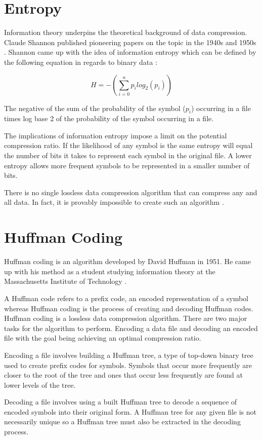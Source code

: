 \doublespacing
\singlespacing
\section{Entropy}


\singlespacing


Information theory underpins the theoretical background of data compression. Claude Shannon published pioneering papers on the topic in the 1940s and 1950s \cite{WikiDataCompression}. Shannon came up with the idea of information entropy which can be defined by the following equation in regards to binary data \cite{MasseyStudyGuide}:


\begin{equation*}
  H = -\left(\sum\limits_{i=0}^n p_{i} log_{2}(p_{i})\right)
\end{equation*}


\doublespacing
\singlespacing
The negative of the sum of the probability of the symbol ($p_{i}$) occurring in a file times log base 2 of the probability of the symbol occurring in a file.


\doublespacing
\singlespacing
The implications of information entropy impose a limit on the potential compression ratio. If the likelihood of any symbol is the same entropy will equal the number of bits it takes to represent each symbol in the original file. A lower entropy allows more frequent symbols to be represented in a smaller number of bits.


\doublespacing
\singlespacing
There is no single lossless data compression algorithm that can compress any and all data. In fact, it is provably impossible to create such an algorithm \cite{WikiLossless}.


\section{Huffman Coding}


\doublespacing
\singlespacing
Huffman coding is an algorithm developed by David Huffman in 1951. He came up with his method as a student studying information theory at the Massachusetts Institute of Technology \cite{WikiHuffman}.


\doublespacing
\singlespacing
A Huffman code refers to a prefix code, an encoded representation of a symbol whereas Huffman coding is the process of creating and decoding Huffman codes. Huffman coding is a lossless data compression algorithm. There are two major tasks for the algorithm to perform. Encoding a data file and decoding an encoded file with the goal being achieving an optimal compression ratio.


\doublespacing
\singlespacing
Encoding a file involves building a Huffman tree, a type of top-down binary tree used to create prefix codes for symbols. Symbols that occur more frequently are closer to the root of the tree and ones that occur less frequently are found at lower levels of the tree.


\doublespacing
\singlespacing
Decoding a file involves using a built Huffman tree to decode a sequence of encoded symbols into their original form. A Huffman tree for any given file is not necessarily unique so a Huffman tree must also be extracted in the decoding process.